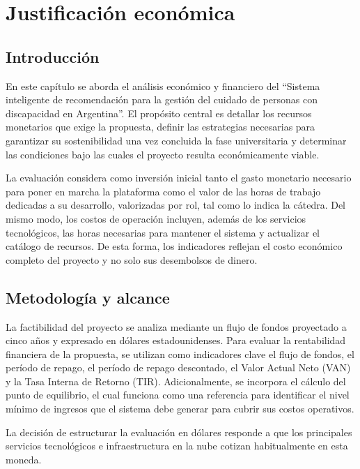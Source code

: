 
\chapter{Justificación económica}\label{cap:economica}

\section{Introducción}

En este capítulo se aborda el análisis económico y financiero del ``Sistema inteligente de recomendación para la gestión del cuidado de personas con discapacidad en Argentina''. El propósito central es detallar los recursos monetarios que exige la propuesta, definir las estrategias necesarias para garantizar su sostenibilidad una vez concluida la fase universitaria y determinar las condiciones bajo las cuales el proyecto resulta económicamente viable.

La evaluación considera como inversión inicial tanto el gasto monetario necesario para poner en marcha la plataforma como el valor de las horas de trabajo dedicadas a su desarrollo, valorizadas por rol, tal como lo indica la cátedra. Del mismo modo, los costos de operación incluyen, además de los servicios tecnológicos, las horas necesarias para mantener el sistema y actualizar el catálogo de recursos. De esta forma, los indicadores reflejan el costo económico completo del proyecto y no solo sus desembolsos de dinero.

\section{Metodología y alcance}

La factibilidad del proyecto se analiza mediante un flujo de fondos proyectado a cinco años y expresado en dólares estadounidenses. Para evaluar la rentabilidad financiera de la propuesta, se utilizan como indicadores clave el flujo de fondos, el período de repago, el período de repago descontado, el Valor Actual Neto (VAN) y la Tasa Interna de Retorno (TIR). Adicionalmente, se incorpora el cálculo del punto de equilibrio, el cual funciona como una referencia para identificar el nivel mínimo de ingresos que el sistema debe generar para cubrir sus costos operativos.

La decisión de estructurar la evaluación en dólares responde a que los principales servicios tecnológicos e infraestructura en la nube cotizan habitualmente en esta moneda.

